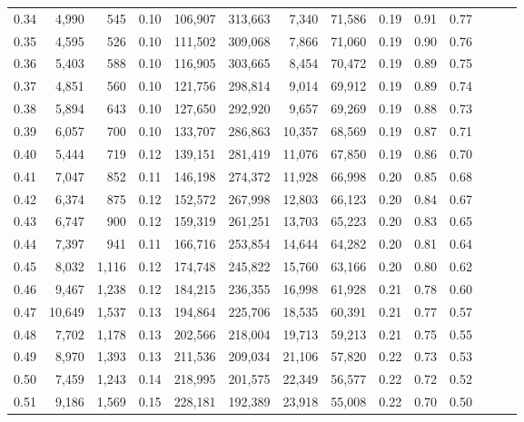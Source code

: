 \begin{tabular}{rrrrrrrrrrrrrr}
0.34 &   4,990 &    545 &  0.10 &  106,907 &  313,663 &   7,340 &  71,586 &  0.19 &  0.91 &      0.77 \\
0.35 &   4,595 &    526 &  0.10 &  111,502 &  309,068 &   7,866 &  71,060 &  0.19 &  0.90 &      0.76 \\
0.36 &   5,403 &    588 &  0.10 &  116,905 &  303,665 &   8,454 &  70,472 &  0.19 &  0.89 &      0.75 \\
0.37 &   4,851 &    560 &  0.10 &  121,756 &  298,814 &   9,014 &  69,912 &  0.19 &  0.89 &      0.74 \\
0.38 &   5,894 &    643 &  0.10 &  127,650 &  292,920 &   9,657 &  69,269 &  0.19 &  0.88 &      0.73 \\
0.39 &   6,057 &    700 &  0.10 &  133,707 &  286,863 &  10,357 &  68,569 &  0.19 &  0.87 &      0.71 \\
0.40 &   5,444 &    719 &  0.12 &  139,151 &  281,419 &  11,076 &  67,850 &  0.19 &  0.86 &      0.70 \\
0.41 &   7,047 &    852 &  0.11 &  146,198 &  274,372 &  11,928 &  66,998 &  0.20 &  0.85 &      0.68 \\
0.42 &   6,374 &    875 &  0.12 &  152,572 &  267,998 &  12,803 &  66,123 &  0.20 &  0.84 &      0.67 \\
0.43 &   6,747 &    900 &  0.12 &  159,319 &  261,251 &  13,703 &  65,223 &  0.20 &  0.83 &      0.65 \\
0.44 &   7,397 &    941 &  0.11 &  166,716 &  253,854 &  14,644 &  64,282 &  0.20 &  0.81 &      0.64 \\
0.45 &   8,032 &  1,116 &  0.12 &  174,748 &  245,822 &  15,760 &  63,166 &  0.20 &  0.80 &      0.62 \\
0.46 &   9,467 &  1,238 &  0.12 &  184,215 &  236,355 &  16,998 &  61,928 &  0.21 &  0.78 &      0.60 \\
0.47 &  10,649 &  1,537 &  0.13 &  194,864 &  225,706 &  18,535 &  60,391 &  0.21 &  0.77 &      0.57 \\
0.48 &   7,702 &  1,178 &  0.13 &  202,566 &  218,004 &  19,713 &  59,213 &  0.21 &  0.75 &      0.55 \\
0.49 &   8,970 &  1,393 &  0.13 &  211,536 &  209,034 &  21,106 &  57,820 &  0.22 &  0.73 &      0.53 \\
0.50 &   7,459 &  1,243 &  0.14 &  218,995 &  201,575 &  22,349 &  56,577 &  0.22 &  0.72 &      0.52 \\
0.51 &   9,186 &  1,569 &  0.15 &  228,181 &  192,389 &  23,918 &  55,008 &  0.22 &  0.70 &      0.50 \\

\end{tabular}
